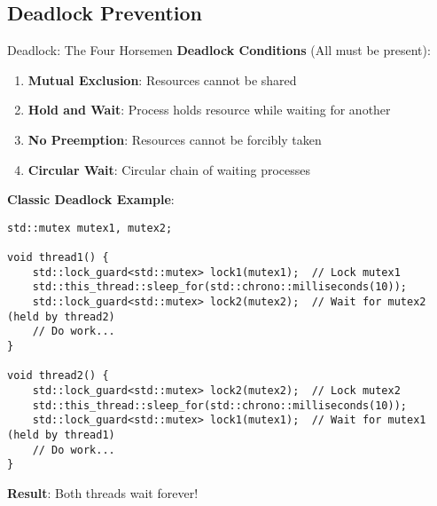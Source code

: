 \subsection{Deadlock Prevention}
\begin{frame}[fragile]{ Deadlock: The Four Horsemen}
	\textbf{Deadlock Conditions} (All must be present):
	\begin{enumerate}
		\item \textbf{Mutual Exclusion}: Resources cannot be shared
		\item \textbf{Hold and Wait}: Process holds resource while waiting for another
		\item \textbf{No Preemption}: Resources cannot be forcibly taken
		\item \textbf{Circular Wait}: Circular chain of waiting processes
	\end{enumerate}

	\vspace{1em}
	\textbf{Classic Deadlock Example}:
	\begin{verbatim}
std::mutex mutex1, mutex2;

void thread1() {
    std::lock_guard<std::mutex> lock1(mutex1);  // Lock mutex1
    std::this_thread::sleep_for(std::chrono::milliseconds(10));
    std::lock_guard<std::mutex> lock2(mutex2);  // Wait for mutex2 (held by thread2)
    // Do work...
}

void thread2() {
    std::lock_guard<std::mutex> lock2(mutex2);  // Lock mutex2
    std::this_thread::sleep_for(std::chrono::milliseconds(10));
    std::lock_guard<std::mutex> lock1(mutex1);  // Wait for mutex1 (held by thread1)
    // Do work...
}
	\end{verbatim}

	 \textbf{Result}: Both threads wait forever!
\end{frame}

